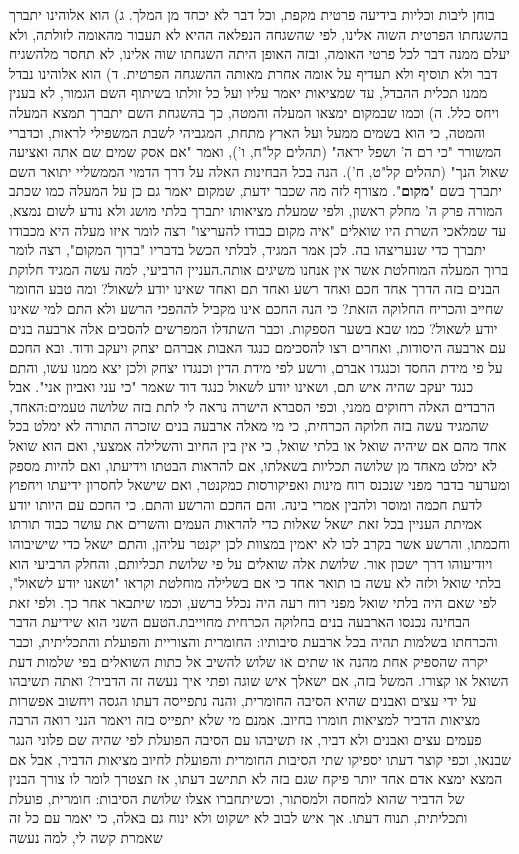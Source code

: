 \documentclass[12pt, openany]{book}
\begin{document}
בוחן ליבות וכליות בידיעה פרטית מקפת, וכל דבר לא יכחד מן המלך. ג) הוא אלוהינו יתברך בהשגחתו הפרטית השוה אלינו, לפי שהשגחה הנפלאה ההיא לא תעבור מהאומה לזולתה, ולא יעלם ממנה דבר לכל פרטי האומה, ובזה האופן היתה השגחתו שוה אלינו, לא תחסר מלהשגיח דבר ולא תוסיף ולא תעדיף על אומה אחרת מאותה ההשגחה הפרטית. ד) הוא אלוהינו נבדל ממנו תכלית ההבדל, עד שמציאות יאמר עליו ועל כל זולתו בשיתוף השם הגמור, לא בענין ויחס כלל. ה) וכמו שבמקום ימצאו המעלה והמטה, כך בהשגחת השם יתברך תמצא המעלה והמטה, כי הוא בשמים ממעל ועל הארץ מתחת, המגביהי לשבת המשפילי לראות, וכדברי המשורר "כי רם ה' ושפל יראה" (תהלים קל"ח, ו'), ואמר "אם אסק שמים שם אתה ואציעה שאול הנך" (תהלים קל"ט, ח'). הנה בכל הבחינות האלה על דרך הדמוי הממשליי יתואר השם יתברך בשם "\textrm{\textbf{מקום}}". מצורף לזה מה שכבר ידעת, שמקום יאמר גם כן על המעלה כמו שכתב המורה פרק ה' מחלק ראשון, ולפי שמעלת מציאותו יתברך בלתי מושג ולא נודע לשום נמצא, עד שמלאכי השרת היו שואלים "איה מקום כבודו להעריצו" רצה לומר איזו מעלה היא מכבודו יתברך כדי שנעריצהו בה. לכן אמר המגיד, לבלתי הכשל בדבריו "ברוך המקום", רצה לומר ברוך המעלה המוחלטת אשר אין אנחנו משיגים אותה.העניין הרביעי, למה עשה המגיד חלוקת הבנים בזה הדרך אחד חכם ואחד רשע ואחד תם ואחד שאינו יודע לשאול? ומה טבע החומר שחייב והכריח החלוקה הזאת? כי הנה החכם אינו מקביל לההפכי הרשע ולא התם למי שאינו יודע לשאול? כמו שבא בשער הספקות. וכבר השתדלו המפרשים להסכים אלה ארבעה בנים עם ארבעה היסודות, ואחרים רצו להסכימם כנגד האבות אברהם יצחק ויעקב ודוד. ובא החכם על פי מידת החסד וכנגדו אברם, ורשע לפי מידת הדין וכנגדו יצחק ולכן יצא ממנו עשו, והתם כנגד יעקב שהיה איש תם, ושאינו יודע לשאול כנגד דוד שאמר "כי עני ואביון אני". אבל הרבדים האלה רחוקים ממני, וכפי הסברא הישרה נראה לי לתת בזה שלושה טעמים:האחד, שהמגיד עשה בזה חלוקה הכרחית, כי מי מאלה ארבעה בנים שזכרה התורה לא ימלט בכל אחד מהם אם שיהיה שואל או בלתי שואל, כי אין בין החיוב והשלילה אמצעי, ואם הוא שואל לא ימלט מאחד מן שלושה תכליות בשאלתו, אם להראות הבטתו וידיעתו, ואם להיות מספק ומערער בדבר מפני שנכנס רוח מינות ואפיקורסות כמקנטר, ואם שישאל לחסרון ידיעתו ויחפוץ לדעת חכמה ומוסר ולהבין אמרי בינה. והם החכם והרשע והתם. כי החכם עם היותו יודע אמיתת העניין בכל זאת ישאל שאלות כדי להראות העמים והשרים את עושר כבוד תורתו וחכמתו, והרשע אשר בקרב לכו לא יאמין במצוות לכן יקנטר עליהן, והתם ישאל כדי שישיבוהו ויודיעוהו דרך ישכון אור. שלושת אלה שואלים על פי שלושת תכליותם, והחלק הרביעי הוא בלתי שואל ולזה לא עשה בו תואר אחד כי אם בשלילה מוחלטת וקראו "ושאנו יודע לשאול", לפי שאם היה בלתי שואל מפני רוח רעה היה נכלל ברשע, וכמו שיתבאר אחר כך. ולפי זאת הבחינה נכנסו הארבעה בנים בחלוקה הכרחית מחוייבת.הטעם השני הוא שידיעת הדבר והכרחתו בשלמות תהיה בכל ארבעת סיבותיו: החומרית והצוריית והפועלת והתכליתית, וכבר יקרה שהספיק אחת מהנה או שתים או שלוש להשיב אל כתות השואלים בפי שלמות דעת השואל או קצורו. המשל בזה, אם ישאלך איש שוגה ופתי איך נעשה זה הדביר? ואתה תשיבהו על ידי עצים ואבנים שהיא הסיבה החומרית, והנה נתפייסה דעתו הגסה ויחשוב אפשרות מציאות הדביר למציאות חומרו בחיוב. אמנם מי שלא יתפייס בזה ויאמר הנני רואה הרבה פעמים עצים ואבנים ולא דביר, אז תשיבהו עם הסיבה הפועלת לפי שהיה שם פלוני הנגר שבנאו, וכפי קוצר דעתו יספיקו שתי הסיבות החומרית והפועלת לחיוב מציאות הדביר, אבל אם המצא ימצא אדם אחד יותר פיקח שגם בזה לא תתישב דעתו, אז תצטרך לומר לו צורך הבנין של הדביר שהוא למחסה ולמסתור, וכשיתחברו אצלו שלושת הסיבות: חומרית, פועלת ותכליתית, תנוח דעתו. אך איש לבוב לא ישקוט ולא ינוח גם באלה, כי יאמר עם כל זה שאמרת קשה לי, למה נעשה 
\end{document}
